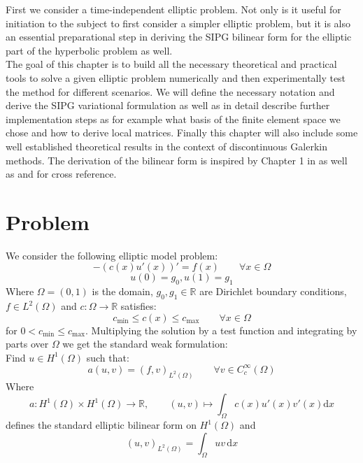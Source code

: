 First we consider a time-independent elliptic problem. Not only is it 
useful for initiation to the subject to first consider a simpler elliptic problem, but it 
is also an essential preparational step in deriving the SIPG bilinear form for the 
elliptic part of the hyperbolic problem as well.
\\
The goal of this chapter is to build all the necessary theoretical and practical 
tools to solve a given elliptic problem 
numerically and then experimentally test the method for different scenarios. 
We will define the necessary notation and derive
the SIPG variational formulation as well as in detail describe further implementation steps as 
for example what basis of the finite element space we chose and how to derive local matrices. 
Finally this chapter will also include some well established theoretical results in 
the context of discontinuous Galerkin methods.
The derivation
of the bilinear form is inspired by 
Chapter 1 in \cite{riviere2008} as well as \cite{georgoulis2011Springer} and \cite{grote2006}
for cross reference.

\section{Problem}
We consider the following elliptic model problem:
\begin{equation}
    \label{eq:elliptic_pde}
    -(c(x)u'(x))' = f(x) \qquad \forall x\in \Omega
\end{equation} 
\begin{equation}
    \label{eq:elliptic_pde_bc}
    u(0) = g_0, u(1) = g_1
\end{equation}
Where $\Omega = (0,1)$ is the domain, $g_0, g_1 \in \mathbb{R}$ are
Dirichlet boundary conditions, $f \in L^2(\Omega)$ and $c:\Omega \to \mathbb{R}$
satisfies:
\[
    c_{\min} \leq c(x) \leq c_{\max} \qquad \forall x\in \Omega
\]
for $0 < c_{\min} \leq c_{\max}$.
Multiplying the solution by a test function and integrating by parts over $\Omega$ we get the 
standard weak formulation: \\
Find $u \in H^1(\Omega)$ such that:
\begin{equation}
    a(u,v) = (f,v)_{L^2(\Omega)} \qquad \forall v \in C_c^{\infty}(\Omega)
\end{equation}
Where 
\[
    a:H^1(\Omega) \times H^1(\Omega) \to \mathbb{R}, \qquad (u,v) \mapsto \int_{\Omega} c(x)u'(x)v'(x) \text{d}x
\]  
defines the standard elliptic bilinear form on $H^1(\Omega)$ and 
\[
    (u,v)_{L^2(\Omega)} = \int_{\Omega} uv \,\text{d}x
\]

